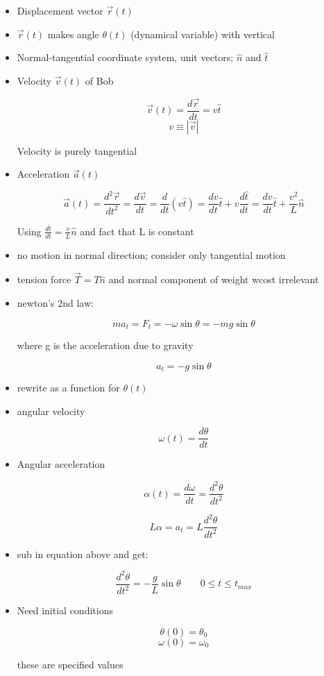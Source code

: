 \begin{itemize}
    \item Displacement vector $\vec{r}(t)$
    \item $\vec{r}(t)$ makes angle $
    \theta(t)$ (dynamical variable) with vertical
    \item Normal-tangential coordinate system, unit vectors; $\hat{n}$ and $\hat{t}$
    \item Velocity $\vec{v}(t)$ of Bob

    \[ \vec{v}(t) = \frac{d\vec{r}}{dt} = v \hat{t}\]
    \[ v \equiv |\vec{v}|\]

    Velocity is purely tangential
    
    \item Acceleration $\vec{a}(t)$

    \[ \vec{a}(t) = \frac{d^2\vec{r}}{dt^2} = \frac{d\vec{v}}{dt} = \frac{d}{dt} (v\hat{t}) = \frac{dv}{dt} \hat{t} + v \frac{d\hat{t}}{dt} = \frac{dv}{dt} \hat{t} + \frac{v^2}{L} \hat{n}\]

    Using $\frac{d\hat{t}}{dt} = \frac{v}{L} \hat{n}$ and fact that L is constant

    \item no motion in normal direction; consider only tangential motion
    \item tension force $\vec{T} = T \hat{n}$ and normal component of weight wcost irrelevant
    \item newton's 2nd law:

    \[ ma_t = F_t = -\omega \sin \theta = -mg \sin \theta \]

    where g is the acceleration due to gravity

    \[ a_t = -g \sin \theta \]

    \item rewrite as a function for $\theta (t)$

    \item angular velocity

    \[ \omega (t) = \frac{d\theta}{dt}\]

    \item Angular acceleration

    \[ \alpha(t) = \frac{d\omega}{dt} = \frac{d^2\theta}{dt^2}\]

    \[ L \alpha = a_t = L \frac{d^2\theta}{dt^2}\]

    \item sub in equation above and get:

    \[ \frac{d^2\theta}{dt^2} = -\frac{g}{L} \sin\theta \qquad 0 \leq t \leq t_{max}\]

    \item Need initial conditions

    \[ \theta(0) = \theta_0\]
    \[ \omega(0) = \omega_0\]

    these are specified values
\end{itemize}

